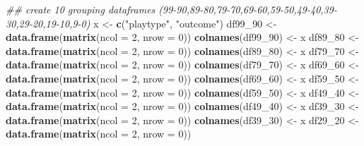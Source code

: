 \documentclass[]{article}
\newenvironment{Shaded}{\begin{snugshade}}{\end{snugshade}}
\newcommand{\CommentTok}[1]{\textcolor[rgb]{0.56,0.35,0.01}{\textit{#1}}}
\newcommand{\DataTypeTok}[1]{\textcolor[rgb]{0.13,0.29,0.53}{#1}}
\newcommand{\DecValTok}[1]{\textcolor[rgb]{0.00,0.00,0.81}{#1}}
\newcommand{\KeywordTok}[1]{\textcolor[rgb]{0.13,0.29,0.53}{\textbf{#1}}}
\newcommand{\NormalTok}[1]{#1}
\newcommand{\StringTok}[1]{\textcolor[rgb]{0.31,0.60,0.02}{#1}}
\begin{document}
\begin{Shaded}
\begin{Highlighting}[]
\CommentTok{## create 10 grouping dataframes (99-90,89-80,79-70,69-60,59-50,49-40,39-30,29-20,19-10,9-0)}
\NormalTok{x <-}\StringTok{ }\KeywordTok{c}\NormalTok{(}\StringTok{"playtype"}\NormalTok{, }\StringTok{"outcome"}\NormalTok{)}
\NormalTok{df99_}\DecValTok{90}\NormalTok{ <-}\StringTok{ }\KeywordTok{data.frame}\NormalTok{(}\KeywordTok{matrix}\NormalTok{(}\DataTypeTok{ncol =} \DecValTok{2}\NormalTok{, }\DataTypeTok{nrow =} \DecValTok{0}\NormalTok{))}
\KeywordTok{colnames}\NormalTok{(df99_}\DecValTok{90}\NormalTok{) <-}\StringTok{ }\NormalTok{x}
\NormalTok{df89_}\DecValTok{80}\NormalTok{ <-}\StringTok{ }\KeywordTok{data.frame}\NormalTok{(}\KeywordTok{matrix}\NormalTok{(}\DataTypeTok{ncol =} \DecValTok{2}\NormalTok{, }\DataTypeTok{nrow =} \DecValTok{0}\NormalTok{))}
\KeywordTok{colnames}\NormalTok{(df89_}\DecValTok{80}\NormalTok{) <-}\StringTok{ }\NormalTok{x}
\NormalTok{df79_}\DecValTok{70}\NormalTok{ <-}\StringTok{ }\KeywordTok{data.frame}\NormalTok{(}\KeywordTok{matrix}\NormalTok{(}\DataTypeTok{ncol =} \DecValTok{2}\NormalTok{, }\DataTypeTok{nrow =} \DecValTok{0}\NormalTok{))}
\KeywordTok{colnames}\NormalTok{(df79_}\DecValTok{70}\NormalTok{) <-}\StringTok{ }\NormalTok{x}
\NormalTok{df69_}\DecValTok{60}\NormalTok{ <-}\StringTok{ }\KeywordTok{data.frame}\NormalTok{(}\KeywordTok{matrix}\NormalTok{(}\DataTypeTok{ncol =} \DecValTok{2}\NormalTok{, }\DataTypeTok{nrow =} \DecValTok{0}\NormalTok{))}
\KeywordTok{colnames}\NormalTok{(df69_}\DecValTok{60}\NormalTok{) <-}\StringTok{ }\NormalTok{x}
\NormalTok{df59_}\DecValTok{50}\NormalTok{ <-}\StringTok{ }\KeywordTok{data.frame}\NormalTok{(}\KeywordTok{matrix}\NormalTok{(}\DataTypeTok{ncol =} \DecValTok{2}\NormalTok{, }\DataTypeTok{nrow =} \DecValTok{0}\NormalTok{))}
\KeywordTok{colnames}\NormalTok{(df59_}\DecValTok{50}\NormalTok{) <-}\StringTok{ }\NormalTok{x}
\NormalTok{df49_}\DecValTok{40}\NormalTok{ <-}\StringTok{ }\KeywordTok{data.frame}\NormalTok{(}\KeywordTok{matrix}\NormalTok{(}\DataTypeTok{ncol =} \DecValTok{2}\NormalTok{, }\DataTypeTok{nrow =} \DecValTok{0}\NormalTok{))}
\KeywordTok{colnames}\NormalTok{(df49_}\DecValTok{40}\NormalTok{) <-}\StringTok{ }\NormalTok{x}
\NormalTok{df39_}\DecValTok{30}\NormalTok{ <-}\StringTok{ }\KeywordTok{data.frame}\NormalTok{(}\KeywordTok{matrix}\NormalTok{(}\DataTypeTok{ncol =} \DecValTok{2}\NormalTok{, }\DataTypeTok{nrow =} \DecValTok{0}\NormalTok{))}
\KeywordTok{colnames}\NormalTok{(df39_}\DecValTok{30}\NormalTok{) <-}\StringTok{ }\NormalTok{x}
\NormalTok{df29_}\DecValTok{20}\NormalTok{ <-}\StringTok{ }\KeywordTok{data.frame}\NormalTok{(}\KeywordTok{matrix}\NormalTok{(}\DataTypeTok{ncol =} \DecValTok{2}\NormalTok{, }\DataTypeTok{nrow =} \DecValTok{0}\NormalTok{))}

\end{Highlighting}
\end{Shaded}
\end{document}
